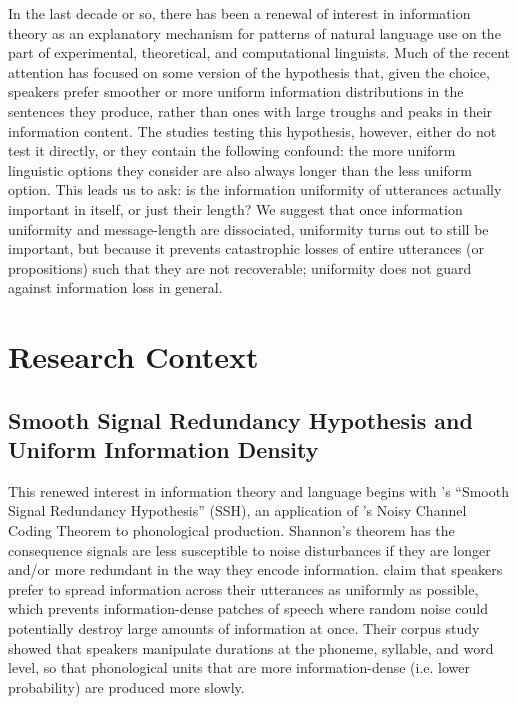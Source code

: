 \documentclass[12pt]{article}
\begin{document}
In the last decade or so, there has been a renewal of interest in information theory as an explanatory mechanism for patterns of natural language use on the part of experimental, theoretical, and computational linguists. Much of the recent attention has focused on some version of the hypothesis that, given the choice, speakers prefer smoother or more uniform information distributions in the sentences they produce, rather than ones with large troughs and peaks in their information content. The studies testing this hypothesis, however, either do not test it directly, or they contain the following confound: the more uniform linguistic options they consider are also always longer than the less uniform option. This leads us to ask: is the information uniformity of utterances actually important in itself, or just their length? We suggest that once information uniformity and message-length are dissociated, uniformity turns out to still be important, but because it prevents catastrophic losses of entire utterances (or propositions) such that they are not recoverable; uniformity does not guard against information loss in general. 
 

\section{Research Context}
\label{context}

\subsection{Smooth Signal Redundancy Hypothesis and Uniform Information Density}

This renewed interest in information theory and language begins with \citet{aylettturk2004}'s ``Smooth Signal Redundancy Hypothesis'' (SSH), an application of \citet{shannon1948}'s Noisy Channel Coding Theorem to phonological production. Shannon's theorem has the consequence signals are less susceptible to noise disturbances if they are longer and/or more redundant in the way they encode information. \citet{aylettturk2004} claim that speakers prefer to spread information across their utterances as uniformly as possible, which prevents information-dense patches of speech where random noise could potentially destroy large amounts of information at once. Their corpus study showed that speakers manipulate durations at the phoneme, syllable, and word level, so that phonological units that are more information-dense (i.e. lower probability) are produced more slowly.
\end{document}
